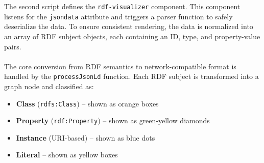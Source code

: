The second script defines the \texttt{rdf-visualizer} component. This component listens for the \texttt{jsondata} attribute and triggers a parser function to safely deserialize the data.  
To ensure consistent rendering, the data is normalized into an array of RDF subject objects, each containing an ID, type, and property-value pairs.
\\
\\
The core conversion from RDF semantics to network-compatible format is handled by the \texttt{processJsonLd} function.  
Each RDF subject is transformed into a graph node and classified as:
\begin{itemize}
    \item \textbf{Class} (\texttt{rdfs:Class}) – shown as orange boxes
    \item \textbf{Property} (\texttt{rdf:Property}) – shown as green-yellow diamonds
    \item \textbf{Instance} (URI-based) – shown as blue dots
    \item \textbf{Literal} – shown as yellow boxes
\end{itemize}
\bigskip 
